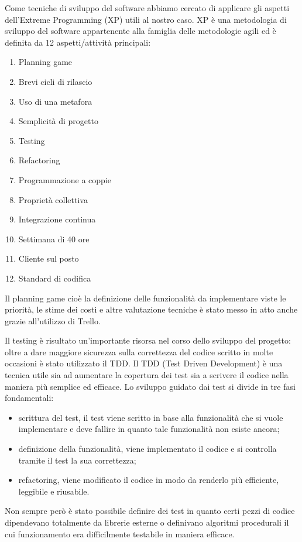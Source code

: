 \documentclass[12pt]{report}
\begin{document}
Come tecniche di sviluppo del software abbiamo cercato di applicare gli aspetti dell'Extreme Programming (XP) utili al nostro caso. XP è una metodologia di sviluppo del software appartenente alla famiglia delle metodologie agili ed è definita da 12 aspetti/attività principali:
\begin{enumerate}
\item Planning game
\item Brevi cicli di rilascio
\item Uso di una metafora
\item Semplicità di progetto
\item Testing
\item Refactoring
\item Programmazione a coppie 
\item Proprietà collettiva 
\item Integrazione continua
\item Settimana di 40 ore
\item Cliente sul posto
\item Standard di codifica
\end{enumerate}

Il planning game cioè la definizione delle funzionalità da implementare viste le priorità, le stime dei costi e altre valutazione tecniche è stato messo in atto anche grazie all'utilizzo di Trello. 

Il testing è risultato un'importante risorsa nel corso dello sviluppo del progetto: oltre a dare maggiore sicurezza sulla correttezza del codice scritto in molte occasioni è stato utilizzato il TDD. Il TDD (Test Driven Development) è una tecnica utile sia ad aumentare la copertura dei test sia a scrivere il codice nella maniera più semplice ed efficace. Lo sviluppo guidato dai test si divide in tre fasi fondamentali:
\begin{itemize}
\item scrittura del test, il test viene scritto in base alla funzionalità che si vuole implementare e deve fallire in quanto tale funzionalità non esiste ancora;
\item definizione della funzionalità, viene implementato il codice e si controlla tramite il test la sua correttezza;
\item refactoring, viene modificato il codice in modo da renderlo più efficiente, leggibile e riusabile.
\end{itemize}

Non sempre però è stato possibile definire dei test in quanto certi pezzi di codice dipendevano totalmente da librerie esterne o definivano algoritmi procedurali il cui funzionamento era difficilmente testabile in maniera efficace. 
\end{document}
